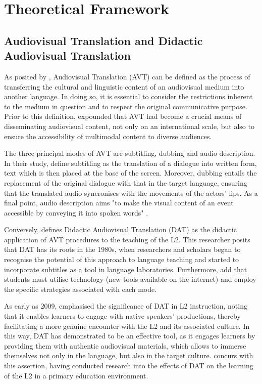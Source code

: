 \section{Theoretical Framework}\label{sec-theoreticalframework}

\subsection{Audiovisual Translation and Didactic Audiovisual Translation} \label{sub-sec-audiovisualtranslation}

As posited by \textcite{diaz-cintas2012subtitulos}, Audiovisual Translation (AVT) can be
defined as the process of transferring the cultural and linguistic
content of an audiovisual medium into another language. In doing so, it
is essential to consider the restrictions inherent to the medium in
question and to respect the original communicative purpose. Prior to
this definition, \textcite{diaz-cintas2009new} expounded that AVT had become a
crucial means of disseminating audiovisual content, not only on an
international scale, but also to ensure the accessibility of multimodal
content to diverse audiences.

The three principal modes of AVT are subtitling, dubbing and audio
description. In their study, \textcite{talavan2023didactic} define subtitling as the translation of a dialogue
into written form, text which is then placed at the base of the screen.
Moreover, dubbing entails the replacement of the original dialogue with
that in the target language, ensuring that the translated audio
syncronises with the movements of the actors' lips. As
a final point, audio description aims "to make the visual content of an
event accessible by conveying it into spoken words" \cite[p. 246]{ibanez2016audiodescription}.

Conversely, \textcite{talavan2019traduccion} defines Didactic Audiovisual Translation
(DAT) as the didactic application of AVT procedures to the teaching of
the L2. This researcher posits that DAT has its roots in the 1980s, when
researchers and scholars began to recognise the potential of this
approach to language teaching and started to incorporate subtitles as a
tool in language laboratories. Furthermore, \textcite{fernandez-costales2023tradilex} add that students must utilise technology (new tools
available on the internet) and employ the specific strategies associated
with each mode.

As early as 2009,  emphasised the significance of DAT in L2
instruction, noting that it enables learners to engage with native
speakers' productions, thereby facilitating a more
genuine encounter with the L2 and its associated culture. In this way,
DAT has demonstrated to be an effective tool, as it engages learners by
providing them with authentic audiovisual materials, which allows to
immerse themselves not only in the language, but also in the target
culture. \textcite{fernandez-costeles2021} concurs with this assertion, having
conducted research into the effects of DAT on the learning of the L2 in
a primary education environment.

